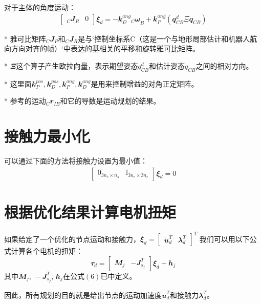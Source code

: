 对于主体的角度运动：
\begin{align}
    \begin{bmatrix}
    _C{\mathbfit J}_R & {\mathbfit 0}
    \end{bmatrix} 
    {\mathbfit \xi}_d = 
    - {\mathbfit k}_D^{ang} {_C{\mathbfit \omega}}_{B}
    + {\mathbfit k}_P^{ang}({\mathbfit q}_{CB}^d \Xi {\mathbfit q}_{CB})
\end{align}

* 雅可比矩阵$_C{\mathbfit J}_P$和$_C{\mathbfit J}_R$是与`控制坐标系C（这是一个与地形局部估计和机器人航向方向对齐的帧）`中表达的基相关的平移和旋转雅可比矩阵。

* ${\mathbfit \Xi}$这个算子产生欧拉向量，表示期望姿态$q^d_{CB}$和估计姿态$q_{CB}$之间的相对方向。

* 这里面${\mathbfit k}_P^{pos}, {\mathbfit k}_D^{pos}, {\mathbfit k}_P^{ang}, {\mathbfit k}_D^{ang}$是用来控制增益的对角正定矩阵。

* 参考的运动$_C{\mathbfit r}_{IB}$和它的导数是运动规划的结果。

\section{接触力最小化}
可以通过下面的方法将接触力设置为最小值：
\begin{align}
    \begin{bmatrix}
    {\mathbfit 0}_{3n_c \times n_u} & {\mathbb I}_{3n_c \times 3n_c}
    \end{bmatrix}
    {\mathbfit \xi}_d = 0
\end{align}

\section{根据优化结果计算电机扭矩}
如果给定了一个优化的节点运动和接触力，${\mathbfit \xi}_d = \begin{bmatrix}
\dot {\mathbfit u}_d^T & {\mathbfit \lambda}_d^T
\end{bmatrix}^T$
我们可以用以下公式计算各个电机的扭矩：
$${\mathbfit \tau}_d = \begin{bmatrix} {\mathbfit M}_j & -{\mathbfit J}^T_{s_j}\end{bmatrix} {\mathbfit \xi}_d + {\mathbfit h}_j$$
其中${\mathbfit M}_j,\, -{\mathbfit J}^T_{s_j}, \, {\mathbfit h}_j$在公式$(6)$已中定义。
\begin{note}
    因此，所有规划的目的就是给出节点的运动加速度$\dot{\mathbfit u}_d^T$和接触力${\mathbfit \lambda}_d^T$。
\end{note}

